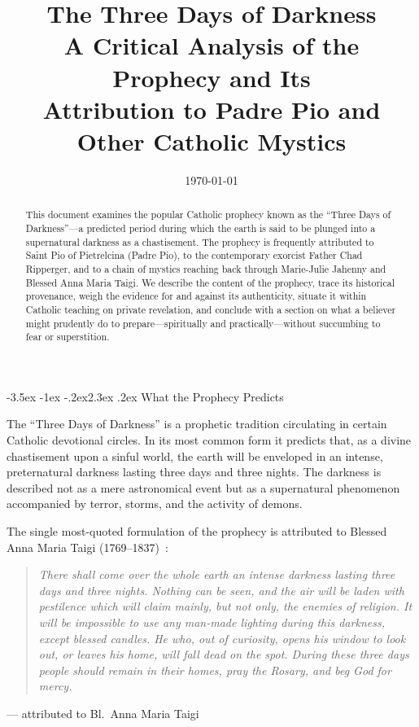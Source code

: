 \documentclass[11pt]{article}
\title{\color{accent}\bfseries The Three Days of Darkness\\[4pt]
  \large\mdseries A Critical Analysis of the Prophecy and Its\\
  Attribution to Padre Pio and Other Catholic Mystics}
\author{}
\date{\today}
\makeatletter
\renewcommand\section{\@startsection{section}{1}{\z@}%
  {-3.5ex \@plus -1ex \@minus -.2ex}{2.3ex \@plus.2ex}%
  {\normalfont\Large\bfseries\color{accent}}}
\newcommand{\quoteblock}[2]{%
  \begin{quote}\itshape #1\end{quote}%
  \begin{flushright}\small\color{slate}--- #2\end{flushright}%
}
\makeatother
\begin{document}
\maketitle
\thispagestyle{fancy}

\begin{abstract}
\noindent This document examines the popular Catholic prophecy known as the
``Three Days of Darkness''---a predicted period during which the earth is said
to be plunged into a supernatural darkness as a chastisement. The prophecy is
frequently attributed to Saint Pio of Pietrelcina (Padre Pio), to the
contemporary exorcist Father Chad Ripperger, and to a chain of mystics
reaching back through Marie-Julie Jahenny and Blessed Anna Maria Taigi. We
describe the content of the prophecy, trace its historical provenance, weigh
the evidence for and against its authenticity, situate it within Catholic
teaching on private revelation, and conclude with a section on what a believer
might prudently do to prepare---spiritually and practically---without
succumbing to fear or superstition.
\end{abstract}

\tableofcontents
\vspace{1em}

\section{What the Prophecy Predicts}

The ``Three Days of Darkness'' is a prophetic tradition circulating in certain
Catholic devotional circles. In its most common form it predicts that, as a
divine chastisement upon a sinful world, the earth will be enveloped in an
intense, preternatural darkness lasting three days and three nights. The
darkness is described not as a mere astronomical event but as a supernatural
phenomenon accompanied by terror, storms, and the activity of demons.

The single most-quoted formulation of the prophecy is attributed to Blessed
Anna Maria Taigi (1769--1837)~\cite{akin}:

\quoteblock{There shall come over the whole earth an intense darkness lasting
three days and three nights. Nothing can be seen, and the air will be laden
with pestilence which will claim mainly, but not only, the enemies of
religion. It will be impossible to use any man-made lighting during this
darkness, except blessed candles. He who, out of curiosity, opens his window
to look out, or leaves his home, will fall dead on the spot. During these
three days people should remain in their homes, pray the Rosary, and beg God
for mercy.}{attributed to Bl.\ Anna Maria Taigi}
\end{document}
